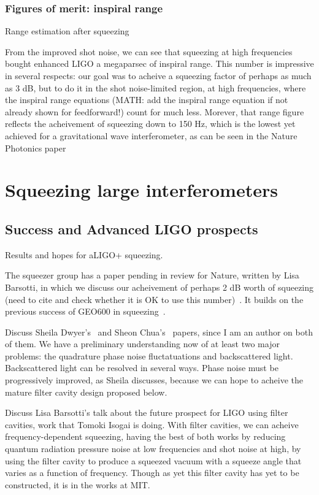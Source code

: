             \subsubsection{Figures of merit: inspiral range}
            \label{range_est}


                Range estimation after squeezing

		From the improved shot noise, we can see that squeezing at high frequencies bought enhanced LIGO a megaparsec of inspiral range. This number is impressive in several respects: our goal was to acheive a squeezing factor of perhaps as much as 3 dB, but to do it in the shot noise-limited region, at high frequencies, where the inspiral range equations (MATH: add the inspiral range equation if not already shown for feedforward!) count for much less. Morever, that range figure reflects the acheivement of squeezing down to 150 Hz, which is the lowest yet achieved for a gravitational wave interferometer, as can be seen in the Nature Photonics paper~\cite{BarsottiNatureSqueezing}


\section{Squeezing large interferometers}

        \subsection{Success and Advanced LIGO prospects}
        \label{squeezing_success}
            Results and hopes for aLIGO+ squeezing.

	    The squeezer group has a paper pending in review for Nature, written by Lisa Barsotti, in which we discuss our acheivement of perhaps 2 dB worth of squeezing (need to cite and check whether it is OK to use this number)~\cite{BarsottiNatureSqueezing}. It builds on the previous success of GEO600 in squeezing~\cite{GEO600NatureSqueezing}.

	    Discuss Sheila Dwyer's~\cite{DwyerPhaseNoise} and Sheon Chua's~\cite{ChuaBackscatteredLight} papers, since I am an author on both of them. We have a preliminary understanding now of at least two major problems: the quadrature phase noise fluctatuations and backscattered light. Backscattered light can be resolved in several ways. Phase noise must be progressively improved, as Sheila discusses, because we can hope to acheive the mature filter cavity design proposed below.

Discuss Lisa Barsotti's talk about the future prospect for LIGO using filter cavities, work that Tomoki Isogai is doing. With filter cavities, we can acheive frequency-dependent squeezing, having the best of both works by reducing quantum radiation pressure noise at low frequencies and shot noise at high, by using the filter cavity to produce a squeezed vacuum with a squeeze angle that varies as a function of frequency. Though as yet this filter cavity has yet to be constructed, it is in the works at MIT.

